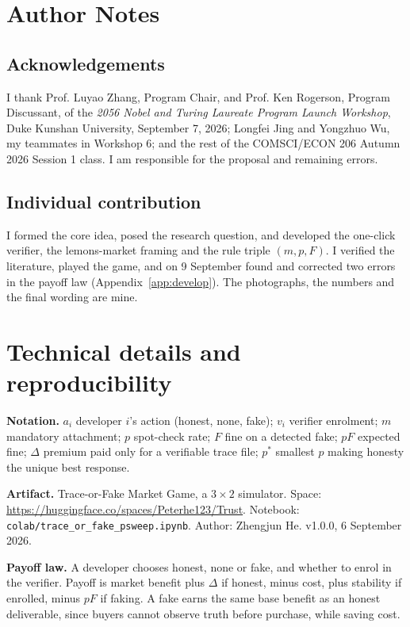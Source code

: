 \clearpage\nobalance
\section*{Author Notes}
\subsection*{Acknowledgements}
I thank Prof. Luyao Zhang, Program Chair, and Prof. Ken Rogerson, Program Discussant, of the \emph{2056 Nobel and Turing Laureate Program Launch Workshop}, Duke Kunshan University, September 7, 2026; Longfei Jing and Yongzhuo Wu, my teammates in Workshop 6; and the rest of the COMSCI/ECON 206 Autumn 2026 Session 1 class. I am responsible for the proposal and remaining errors.
\subsection*{Individual contribution}
I formed the core idea, posed the research question, and developed the one-click verifier, the lemons-market framing and the rule triple $(m,p,F)$. I verified the literature, played the game, and on 9 September found and corrected two errors in the payoff law (Appendix~\ref{app:develop}). The photographs, the numbers and the final wording are mine.


\appendix
\section{Technical details and reproducibility}\label{app:tech}
\textbf{Notation.} $a_i$ developer $i$'s action (honest, none, fake); $v_i$ verifier enrolment; $m$ mandatory attachment; $p$ spot-check rate; $F$ fine on a detected fake; $pF$ expected fine; $\Delta$ premium paid only for a verifiable trace file; $p^{*}$ smallest $p$ making honesty the unique best response.

\textbf{Artifact.} Trace-or-Fake Market Game, a $3\times2$ simulator. Space: \url{https://huggingface.co/spaces/Peterhe123/Trust}. Notebook: \texttt{colab/trace\_or\_fake\_psweep.ipynb}. Author: Zhengjun He. v1.0.0, 6 September 2026.

\textbf{Payoff law.} A developer chooses honest, none or fake, and whether to enrol in the verifier. Payoff is market benefit plus $\Delta$ if honest, minus cost, plus stability if enrolled, minus $pF$ if faking. A fake earns the same base benefit as an honest deliverable, since buyers cannot observe truth before purchase, while saving cost.

